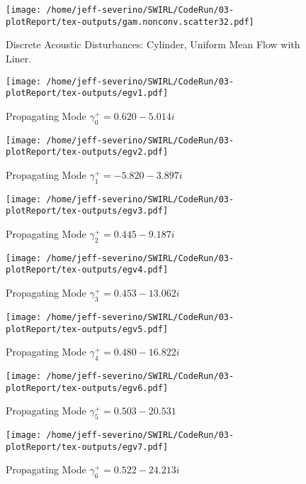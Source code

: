 \documentclass{article}
\begin{document}
 \begin{figure}
     \centering
     \texttt{[image: /home/jeff-severino/SWIRL/CodeRun/03-plotReport/tex-outputs/gam.nonconv.scatter32.pdf]}
     \caption{Discrete Acoustic Disturbances: Cylinder, Uniform Mean Flow with Liner.}
 \end{figure}
 
 

 \begin{figure}
     \centering
     \texttt{[image: /home/jeff-severino/SWIRL/CodeRun/03-plotReport/tex-outputs/egv1.pdf]}
     \caption{Propagating Mode $\gamma^+_0 = 0.620-5.014i$}
 \end{figure}


 \begin{figure}
     \centering
     \texttt{[image: /home/jeff-severino/SWIRL/CodeRun/03-plotReport/tex-outputs/egv2.pdf]}
     \caption{Propagating Mode $\gamma^+_1 = -5.820-3.897i$}
 \end{figure}


 \begin{figure}
     \centering
     \texttt{[image: /home/jeff-severino/SWIRL/CodeRun/03-plotReport/tex-outputs/egv3.pdf]}
     \caption{Propagating Mode $\gamma^+_2 = 0.445-9.187i$}
 \end{figure}


 \begin{figure}
     \centering
     \texttt{[image: /home/jeff-severino/SWIRL/CodeRun/03-plotReport/tex-outputs/egv4.pdf]}
     \caption{Propagating Mode $\gamma^+_3 = 0.453-13.062i$}
 \end{figure}


 \begin{figure}
     \centering
     \texttt{[image: /home/jeff-severino/SWIRL/CodeRun/03-plotReport/tex-outputs/egv5.pdf]}
     \caption{Propagating Mode $\gamma^+_4 = 0.480 - 16.822i$}
 \end{figure}


 \begin{figure}
     \centering
     \texttt{[image: /home/jeff-severino/SWIRL/CodeRun/03-plotReport/tex-outputs/egv6.pdf]}
     \caption{Propagating Mode $\gamma^+_5 = 0.503 - 20.531$}
 \end{figure}


 \begin{figure}
     \centering
     \texttt{[image: /home/jeff-severino/SWIRL/CodeRun/03-plotReport/tex-outputs/egv7.pdf]}
     \caption{Propagating Mode $\gamma^+_6 = 0.522 - 24.213i$}
 \end{figure}
\end{document}

